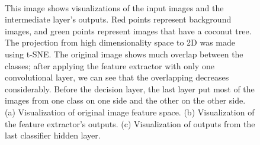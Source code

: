 \documentclass[a4paper,conference]{IEEEtran}
\begin{document}
\begin{figure}
  \centering
  ~
  ~
  \caption{This image shows visualizations of the input images and the intermediate layer's outputs. Red points represent background images, and green points represent images that have a coconut tree. The projection from high dimensionality space to 2D was made using t-SNE. The original image shows much overlap between the classes; after applying the feature extractor with only one convolutional layer, we can see that the overlapping decreases considerably. Before the decision layer, the last layer put most of the images from one class on one side and the other on the other side. (a) Visualization of original image feature space. (b) Visualization of the feature extractor's outputs. (c) Visualization of outputs from the last classifier hidden layer.}
\end{figure}
\end{document}
